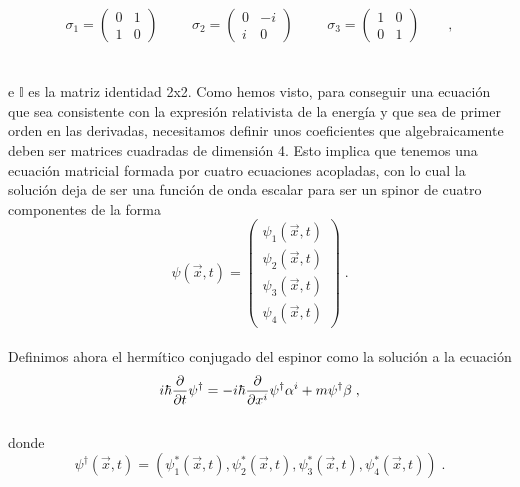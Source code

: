 \documentclass[11pt,letterpaper]{article}     %
\begin{document}
\begin{equation} \label{eq:27}
\sigma_1 = 
\begin{pmatrix}
0 & 1 \\
1 & 0
\end{pmatrix} \hspace{1cm}
\sigma_2=
\begin{pmatrix}
0 & -i \\
i & 0
\end{pmatrix} \hspace{1cm}
\sigma_3=
\begin{pmatrix}
1 & 0 \\
0 & 1
\end{pmatrix} \qquad,
\end{equation}\\ \\
e $\mathbb{I}$ es la matriz identidad 2x2. Como hemos visto, para conseguir una ecuación que sea consistente con la expresión relativista de la energía y que sea de primer orden en las derivadas, necesitamos definir unos coeficientes que algebraicamente deben ser matrices cuadradas de dimensión 4. Esto implica que tenemos una ecuación matricial formada por cuatro ecuaciones acopladas, con lo cual la solución deja de ser una función de onda escalar para ser un spinor de cuatro componentes de la forma
\begin{equation} \label{eq:28}
\psi (\vec{x},t) =
\begin{pmatrix}
\psi_1 (\vec{x},t) \\ \psi_2 (\vec{x},t) \\ \psi_3 (\vec{x},t) \\ \psi_4(\vec{x},t) 
\end{pmatrix} \; .
\end{equation}
\\Definimos ahora el hermítico conjugado del espinor como la solución a la ecuación
\begin{equation} \label{eq:29}
\-i\hbar\frac{\partial}{\partial t} \psi ^\dagger = -i \hbar \frac{\partial}{\partial x^i} \psi^\dagger \alpha^i + m \psi^\dagger \beta \; ,
\end{equation}
\\donde
\begin{equation} \label{eq:30}
\psi ^\dagger (\vec{x},t) = \left(\psi_1^*(\vec{x},t), \psi_2^*(\vec{x},t),\psi_3^*(\vec{x},t),\psi_4^*(\vec{x},t) \right) \;.
\end{equation} \\ \\
\end{document}

